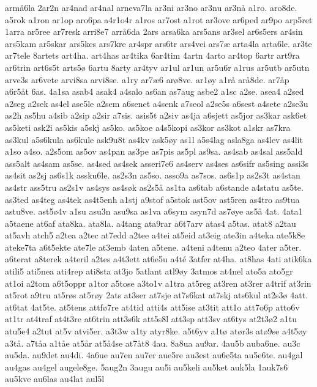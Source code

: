 arm^^e56la
2ar2n
ar4nad
ar4nal
arneva7la
ar3ni
ar3no
ar3nu
ar3n^^e5
a1ro.
aro8de.
a5rok
a1ron
ar1op
aro6pa
a4r1o4r
a1ros
ar7ost
a1rot
ar3ove
ar6ped
ar9po
arp5ret
1arra
ar5ree
ar7resk
arri8e7
arr^^e56da
2ars
arsa6ka
ars5ans
ar3sel
ar6s5ers
ar4sin
ars5kam
ar5skar
ars5kes
ars7kre
ar4spr
ars6tr
ars4vei
ars7^^e6
arta4la
arta6le.
ar3te
ar7tele
8artets
art4ha.
art4has
ar4tika
6ar4tim
4artn
4arto
ar4top
6artr
art9ra
ar6trin
art6s5t
arts5^^f8
6artu
8arty
ar4tyv
ar1ul
ar1un
ar5u6r
a1rus
ar5utb
ar5utn
arve3s
ar6vete
arvi8sa
arvi8se.
a1ry
ar7^^e66
ar^^f88ve.
ar1^^f8y
a1r^^e5
ar^^e58de.
ar7^^e5p
a6r5^^e5t
6as.
4a1sa
asab4
asak4
a4salo
as6an
as7aug
asbe2
a1sc
a2se.
asea4
a2sed
a2seg
a2sek
as4el
ase5le
a2sem
a6senet
a4senk
a7seol
a2se5s
a6sest
a4sete
a2se3u
as2h
as5hu
a4sib
a2sip
a2sir
a7sis.
asis5t
a2siv
as4ja
a6sjett
as5jor
as3kar
ask6et
as5keti
ask2i
as5kis
a5skj
as5ko.
as5koe
a4s5kopi
as3kor
as3kot
a1skr
as7kra
as3kul
a5s6kula
as6kule
ask9u8t
as4kv
ask5^^f8y
as1l
a5s4lag
asla8ga
as4lev
as4lit
a1so
a4so.
a2s5om
as5ov
as4pan
as3pe
as7pis
as5pl
as9sa.
as4sab
as4sal
ass5ald
ass5alt
as4sam
as5se.
as4sed
as4sek
asseri7e6
as4serv
as4ses
as6sifr
as5sing
assi3s
as4sit
as2sj
as6s1k
assku6le.
as2s3n
as5so.
asso9a
as7sos.
as6s1p
as2s3t
as4stan
as4str
ass5tru
as2s1v
as4sys
as4s^^f8k
as2s5^^e5
as1ta
as6tab
a6stande
a4statu
as5te.
as3ted
as4teg
as4tek
as4t5enh
a1stj
a9stof
a5stok
ast5ov
ast5ren
as4tro
as9tua
astu8ve.
ast5^^f84v
a1su
asu3n
asu9sa
as1va
a6sym
asyn7d
as7^^f8ye
as5^^e5
4at.
4ata1
a5taene
at6af
ata8ka.
ata8la.
a4tang
ata9rar
a6t7arv
atas4
a5tas.
atat8
a2tau
at5avh
atch5
a2tea
a2tec
at7edd
a2tee
a4tei
at5eid
at3eig
ate3in
a4teka
ate5k8e
ateke7ta
a6t5ekte
ate7le
at3emb
4aten
a5tene.
a4teni
a4tenu
a2teo
4ater
a5ter.
a6terat
a8terek
a4teril
a2tes
a4t3ett
at6e5u
a4t^^e9
3atfer
at4ha.
at8has
4ati
atik6ka
atili5
ati5nea
ati4rep
ati8sta
at3jo
5atlant
atl9^^f8y
3atmos
at4nel
ato5a
ato5gr
at1oi
a2tom
a6t5oppr
a1tor
a5tose
a3to1v
a1tra
at5reg
at3ren
at3rer
a4trif
at3rin
at5rot
a9tru
at5r^^f8s
at5r^^f8y
2ats
at3ser
at7sje
at7s6kat
at7skj
ats6kul
at2s3^^f8
4att.
at6tat
4at5te.
at5tens
attf^^f87re
at4tid
atti4s
att5ise
at3tit
att1o
att7o6p
atto6v
at1tr
at4traf
at4t3re
at6trin
att3s6k
att5s8l
att3sp
att3sv
at6tys
at2t3^^f82
a1tu
atu5e4
a2tut
at5v
atvi5er.
a3t3w
a1ty
atyr8ke.
a5t6yv
a1t^^f8
at^^f8r3s
at^^f89se
a4t5^^f8y
a3t^^e5.
a7t^^e5a
a1t^^e5e
at5^^e5r
at5^^e54se
at7^^e5t8
4au.
8a8ua
au9ar.
4au5b
auba6ne.
au3c
au5da.
au9det
au4di.
4a6ue
au7en
au7er
aue5re
au3est
au6e5ta
au5e6te.
au4gal
au4gas
au4gel
augele8ge.
5aug2n
3augu
au5i
au5keli
au5ket
auk5la
1auk7s6
au5kve
au6las
au4lat
aul5l
